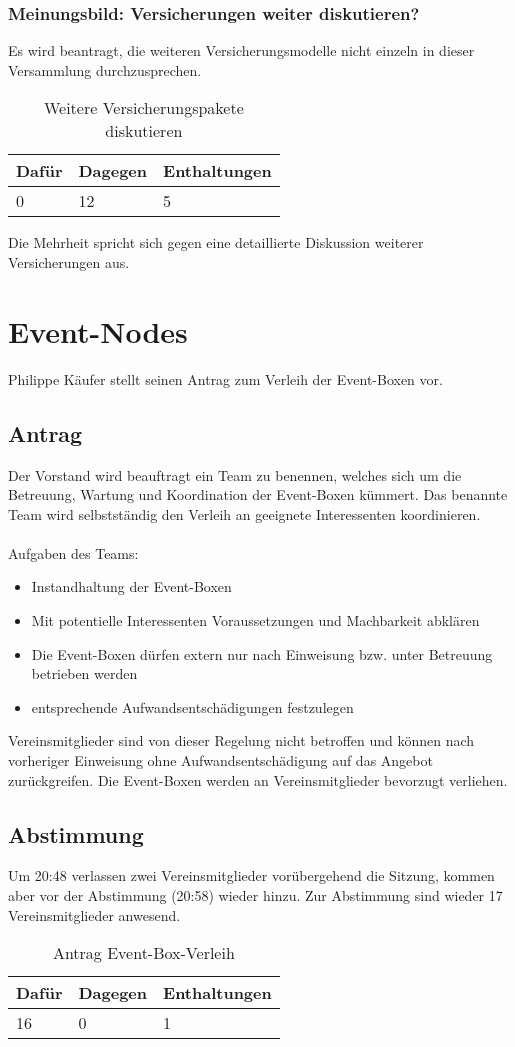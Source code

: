 \documentclass[a4paper]{scrartcl}
\begin{document}
\subsubsection{Meinungsbild: Versicherungen weiter diskutieren?}
Es wird beantragt, die weiteren Versicherungsmodelle nicht einzeln in dieser Versammlung durchzusprechen.\\
\begin{table}[h]
	\begin{tabularx}{\textwidth}{XXX}
		Dafür & Dagegen & Enthaltungen\\
		\toprule
		0 & 12 & 5\\
	\end{tabularx}
	\caption{Weitere Versicherungspakete diskutieren}
\end{table}
Die Mehrheit spricht sich gegen eine detaillierte Diskussion weiterer Versicherungen aus.
\clearpage
\section{Event-Nodes}
Philippe Käufer stellt seinen Antrag zum Verleih der Event-Boxen vor.
\subsection{Antrag}
Der Vorstand wird beauftragt ein Team zu benennen, welches sich um die Betreuung, Wartung und Koordination der Event-Boxen kümmert. Das benannte Team wird selbstständig den Verleih an geeignete Interessenten koordinieren.\\ \\
Aufgaben des Teams:
\begin{itemize}
\item Instandhaltung der Event-Boxen
\item Mit potentielle Interessenten Voraussetzungen und Machbarkeit abklären 
\item Die Event-Boxen dürfen extern nur nach Einweisung bzw. unter Betreuung betrieben werden
\item entsprechende Aufwandsentschädigungen festzulegen
\end{itemize}
Vereinsmitglieder sind von dieser Regelung nicht betroffen und können nach vorheriger Einweisung ohne Aufwandsentschädigung auf das Angebot zurückgreifen. Die Event-Boxen werden an Vereinsmitglieder bevorzugt verliehen.\\
\subsection{Abstimmung}
Um 20:48 verlassen zwei Vereinsmitglieder vorübergehend die Sitzung, kommen aber vor der Abstimmung (20:58) wieder hinzu. Zur Abstimmung sind wieder 17 Vereinsmitglieder anwesend.\\
\begin{table}[h]
	\begin{tabularx}{\textwidth}{XXX}
		Dafür & Dagegen & Enthaltungen\\
		\toprule
		16 & 0 & 1\\
	\end{tabularx}
	\caption{Antrag Event-Box-Verleih}
\end{table}
\clearpage
\end{document}

